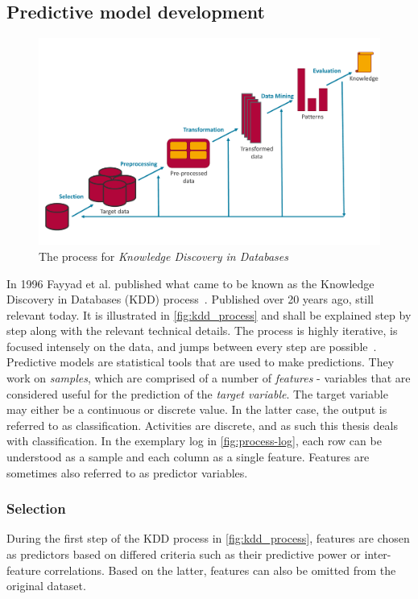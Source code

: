 \subsection{Predictive model development}
\label{sec:predictive-model-development}
\begin{figure}
    \centering
    \includegraphics[width=\textwidth]{gfx/kdd-process.pdf}
    \caption{The process for \textit{Knowledge Discovery in Databases}}
    \label{fig:kdd_process}
\end{figure}
In 1996 Fayyad et al. published what came to be known as the Knowledge Discovery in Databases (KDD) process~\cite{fayyad1996data}. Published over 20 years ago, still relevant today. It is illustrated in \autoref{fig:kdd_process} and shall be explained step by step along with the relevant technical details. The process is highly iterative, is focused intensely on the data, and jumps between every step are possible~\cite{kuhn2013applied}.\\

Predictive models are statistical tools that are used to make predictions. They work on \textit{samples}, which are comprised of a number of \textit{features} - variables that are considered useful for the prediction of the \textit{target variable}. The target variable may either be a continuous or discrete value. In the latter case, the output is referred to as classification. Activities are discrete, and as such this thesis deals with classification. In the exemplary log in \autoref{fig:process-log}, each row can be understood as a sample and each column as a single feature. Features are sometimes also referred to as predictor variables.

\subsubsection*{Selection}
During the first step of the KDD process in \autoref{fig:kdd_process}, features are chosen as predictors based on differed criteria such as their predictive power or inter-feature correlations. Based on the latter, features can also be omitted from the original dataset.

